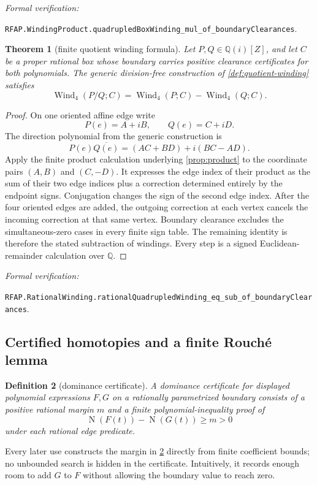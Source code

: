 \documentclass[11pt]{article}
\newtheorem{theorem}{Theorem}[section]
\newtheorem{definition}[theorem]{Definition}
\newcommand{\Qi}{\mathbb{Q}(i)}
\newcommand{\Q}{\mathbb{Q}}
\newcommand{\Norm}[1]{\operatorname{N}\!\left(#1\right)}
\newcommand{\Wind}{\operatorname{Wind}}
\newcommand{\leanref}[1]{\par\smallskip\noindent
  \emph{Formal verification:}\par\nobreak
  {\raggedright\nolinkurl{#1}.\par}}
\begin{document}
\leanref{RFAP.WindingProduct.quadrupledBoxWinding_mul_of_boundaryClearances}

\begin{theorem}[finite quotient winding formula]
\label{thm:rfap-quotient}
Let $P,Q\in\Qi[Z]$, and let $C$ be a proper rational box whose boundary
carries positive clearance certificates for both polynomials.  The generic
division-free construction of \cref{def:quotient-winding} satisfies
\[
       \Wind_4(P/Q;C)=\Wind_4(P;C)-\Wind_4(Q;C).
\]
\end{theorem}

\begin{proof}
On one oriented affine edge write
\[
 P(e)=A+iB,
 \qquad
 Q(e)=C+iD.
\]
The direction polynomial from the generic construction is
\[
 P(e)\overline{Q(e)}=(AC+BD)+i(BC-AD).
\]
Apply the finite product calculation underlying
\cref{prop:product} to the coordinate pairs $(A,B)$ and $(C,-D)$.
It expresses the edge index of their product as the sum of their two edge
indices plus a correction determined entirely by the endpoint signs.
Conjugation changes the sign of the second edge index.  After the four
oriented edges are added, the outgoing correction at each vertex cancels
the incoming correction at that same vertex.  Boundary clearance excludes
the simultaneous-zero cases in every finite sign table.  The remaining
identity is therefore the stated subtraction of windings.  Every step is a
signed Euclidean-remainder calculation over $\Q$.
\end{proof}

\leanref{RFAP.RationalWinding.rationalQuadrupledWinding_eq_sub_of_boundaryClearances}

\subsection{Certified homotopies and a finite Rouché lemma}

\begin{definition}[dominance certificate]
\label{def:dominance-certificate}
A \emph{dominance certificate} for displayed polynomial expressions $F,G$
on a rationally parametrized boundary consists of a positive rational margin
$m$ and a finite polynomial-inequality proof of
\[
        \Norm{F(t)}-\Norm{G(t)}\ge m>0
\]
under each rational edge predicate.
\end{definition}

Every later use constructs the margin in
\cref{def:dominance-certificate} directly from finite coefficient bounds;
no unbounded search is hidden in the certificate.  Intuitively, it records
enough room to add $G$ to $F$ without allowing the boundary value to reach
zero.
\end{document}
